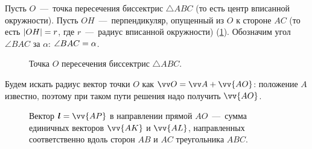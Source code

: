 \documentclass[a4paper,12pt]{article}
\begin{document}
  \begin{solution}
    Пусть $O$~---~точка пересечения биссектрис $\triangle ABC$ (то есть центр вписанной окружности).
    Пусть $OH$~---~перпендикуляр, опущенный из $O$ к стороне $AC$ (то есть $|OH| \hm= r$, где $r$~---~радиус вписанной окружности) (\ref{fig:bisectors-intersection}).
    Обозначим угол $\angle BAC$ за $\alpha$: $\angle BAC \hm= \alpha$.
    
    \begin{figure}[h]
      \centering
      
      
      \caption{Точка $O$ пересечения биссектрис $\triangle ABC$.}
      \label{fig:bisectors-intersection}
    \end{figure}
    
    Будем искать радиус вектор точки $O$ как $\vv O = \vv A + \vv{AO}$: положение $A$ известно, поэтому при таком пути решения надо получить $\vv{AO}$.

    \begin{figure}[h]
      \centering
      
      
      \caption{Вектор $\bds l \hm= \protect\vv{AP}$ в направлении прямой $AO$~---~сумма единичных векторов $\protect\vv{AK}$ и $\protect\vv{AL}$, направленных соответственно вдоль сторон $AB$ и $AC$ треугольника $ABC$.}
      \label{fig:l-parallel-ao}
    \end{figure}
    

\end{solution}
\end{document}
